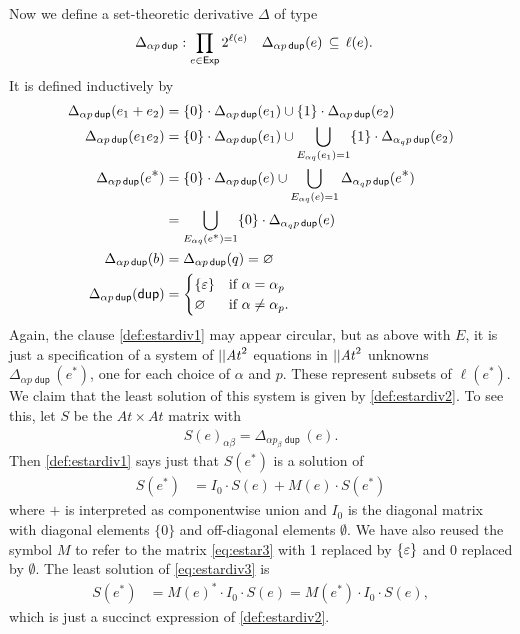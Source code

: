 \documentclass{article}
\newcommand\At{\ensuremath{\mathit{At}}}
\newcommand\pdup{\mathop{\mathsf{dup}}}
\newcommand\Exp{\mathsf{Exp}}
\renewcommand\star{^{\textstyle *}}
\newcommand\STD{\Delta}
\newcommand\STDM{S}
\begin{document}
Now we define a set-theoretic derivative $\STD$ of type
\begin{align*}
\STD_{\alpha p\pdup} &: \prod_{e\in\Exp}2^{\ell(e)} & \STD_{\alpha p\pdup}(e) &\subs \ell(e).
\end{align*}
It is defined inductively by
\begin{align}
\STD_{\alpha p\pdup}(e_1+e_2) &= \{0\}\cdot\STD_{\alpha p\pdup}(e_1) \cup \{1\}\cdot\STD_{\alpha p\pdup}(e_2)\nonumber\\
\STD_{\alpha p\pdup}(e_1e_2) &= \{0\}\cdot\STD_{\alpha p\pdup}(e_1) \cup \bigcup_{E_{\alpha q}(e_1)=1} \{1\}\cdot\STD_{\alpha_qp\pdup}(e_2)\nonumber\\
\STD_{\alpha p\pdup}(e\star) &= \{0\}\cdot\STD_{\alpha p\pdup}(e) \cup \bigcup_{E_{\alpha q}(e)=1}\STD_{\alpha_qp\pdup}(e\star)\label{def:estardiv1}\\
&= \bigcup_{E_{\alpha q}(e^{\scriptstyle *})=1} \{0\}\cdot\STD_{\alpha_qp\pdup}(e)\label{def:estardiv2}\\
\STD_{\alpha p\pdup}(b) &= \STD_{\alpha p\pdup}(q) = \emptyset\nonumber\\
\STD_{\alpha p\pdup}(\pdup) &= \begin{cases}
\{\eps\} & \text{if $\alpha=\alpha_p$}\\
\emptyset & \text{if $\alpha\neq\alpha_p$.}\nonumber
\end{cases}
\end{align}
Again, the clause \eqref{def:estardiv1} may appear circular, but as above with $E$, it is just a specification of a system of $\len\At^2$ equations in $\len\At^2$ unknowns $\STD_{\alpha p\pdup}(e\star)$, one for each choice of $\alpha$ and $p$. These represent subsets of $\ell(e\star)$. We claim that the least solution of this system is given by \eqref{def:estardiv2}. To see this, let $\STDM$ be the $\At\times\At$ matrix with
\begin{gather*}
\STDM(e)_{\alpha\beta} = \STD_{\alpha p_\beta\pdup}(e).
\end{gather*}
Then \eqref{def:estardiv1} says just that $\STDM(e\star)$ is a solution of
\begin{align}
\STDM(e\star) &= I_0\cdot\STDM(e) + M(e)\cdot\STDM(e\star)\label{eq:estardiv3}
\end{align}
where $+$ is interpreted as componentwise union and $I_0$ is the diagonal matrix with diagonal elements $\{0\}$ and off-diagonal elements $\emptyset$. We have also reused the symbol $M$ to refer to the matrix \eqref{eq:estar3} with 1 replaced by $\{\varepsilon\}$ and $0$ replaced by $\emptyset$. The least solution of \eqref{eq:estardiv3} is 
\begin{align*}
\STDM(e\star) &= M(e)\star\cdot I_0\cdot\STDM(e) = M(e\star)\cdot I_0\cdot\STDM(e),
\end{align*}
which is just a succinct expression of \eqref{def:estardiv2}.
\end{document}
